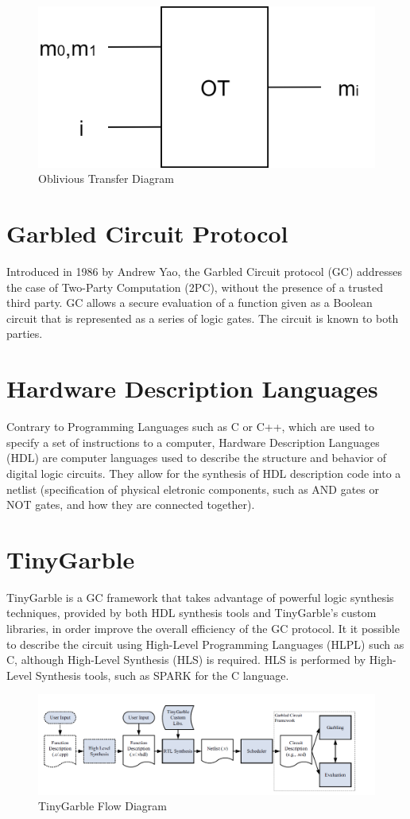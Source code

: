 \renewcommand{\figurename}{Figure}
\begin{figure}[H]
\centering
\includegraphics[width=.4\linewidth]{./figures/mpc/OT}
\caption{Oblivious Transfer Diagram}
\label{fig:otscheme}
\end{figure}

\section{Garbled Circuit Protocol}
Introduced in 1986 by Andrew Yao, the Garbled Circuit protocol (GC) addresses the case
of Two-Party Computation (2PC), without the presence of a trusted third party.
GC allows a secure evaluation of a function given as a Boolean circuit that is represented as a series of logic gates.
The circuit is known to both parties.\\

\section{Hardware Description Languages}
Contrary to Programming Languages such as C or C++, which are used to specify a set of instructions to a computer, Hardware Description Languages (HDL) are computer languages used to describe the structure and behavior of digital logic circuits. They allow for the synthesis of HDL description code into a netlist (specification of physical eletronic components, such as AND gates or NOT gates, and how they are connected together).

\section{TinyGarble}
TinyGarble is a GC framework that takes advantage of powerful logic synthesis techniques, provided by both HDL synthesis tools
and TinyGarble's custom libraries, in order improve the overall efficiency of the GC protocol.
It it possible to describe the circuit using High-Level Programming Languages (HLPL) such as C, although High-Level Synthesis (HLS) is required. HLS is performed by High-Level Synthesis tools, such as SPARK for the C language.

\renewcommand{\figurename}{Figure}
\begin{figure}[H]
\centering
\includegraphics[width=.9\linewidth]{./figures/mpc/tinygarble_flow_diagram}
\caption{TinyGarble Flow Diagram}
\label{fig:tgdiagram}
\end{figure}

